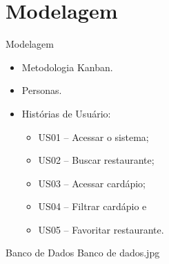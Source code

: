 \section{Modelagem}\label{sec:modelagem}
\begin{frame}[allowframebreaks]{Modelagem}
	\begin{itemize}
		\setlength{\itemsep}{0.5em}
		\item<1-> Metodologia Kanban.
		\item<1-> Personas.
		\item<1-> Histórias de Usuário:
		\begin{itemize}
			\setlength{\itemsep}{0.5em}
			\item<1-> US01 -- Acessar o sistema;
			\item<1-> US02 -- Buscar restaurante;
			\item<1-> US03 -- Acessar cardápio;
			\item<1-> US04 -- Filtrar cardápio e
			\item<1-> US05 -- Favoritar restaurante.
		\end{itemize}
	\end{itemize}
\end{frame}

\begin{frame}[allowframebreaks]{Banco de Dados}
	Banco de dados.jpg
\end{frame}
